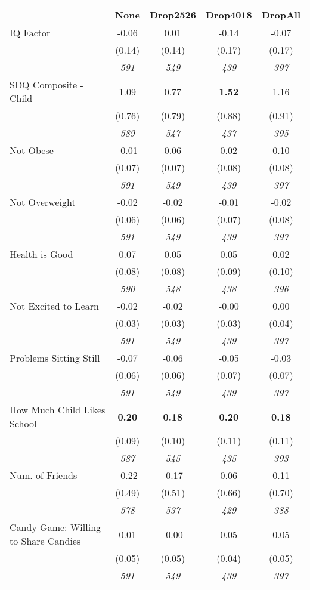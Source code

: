 \begin{tabular}{l c c c c}
\toprule
 & None & Drop2526 & Drop4018 & DropAll \\
\midrule
IQ Factor & -0.06 & 0.01 & -0.14 & -0.07 \\
& (0.14) & (0.14) & (0.17) & (0.17) \\
& \textit{ 591 } & \textit{ 549 } & \textit{ 439 } & \textit{ 397 } \\
SDQ Composite - Child & 1.09 & 0.77 & \textbf{ 1.52 } & 1.16 \\
& (0.76) & (0.79) & (0.88) & (0.91) \\
& \textit{ 589 } & \textit{ 547 } & \textit{ 437 } & \textit{ 395 } \\
Not Obese & -0.01 & 0.06 & 0.02 & 0.10 \\
& (0.07) & (0.07) & (0.08) & (0.08) \\
& \textit{ 591 } & \textit{ 549 } & \textit{ 439 } & \textit{ 397 } \\
Not Overweight & -0.02 & -0.02 & -0.01 & -0.02 \\
& (0.06) & (0.06) & (0.07) & (0.08) \\
& \textit{ 591 } & \textit{ 549 } & \textit{ 439 } & \textit{ 397 } \\
Health is Good & 0.07 & 0.05 & 0.05 & 0.02 \\
& (0.08) & (0.08) & (0.09) & (0.10) \\
& \textit{ 590 } & \textit{ 548 } & \textit{ 438 } & \textit{ 396 } \\
Not Excited to Learn & -0.02 & -0.02 & -0.00 & 0.00 \\
& (0.03) & (0.03) & (0.03) & (0.04) \\
& \textit{ 591 } & \textit{ 549 } & \textit{ 439 } & \textit{ 397 } \\
Problems Sitting Still & -0.07 & -0.06 & -0.05 & -0.03 \\
& (0.06) & (0.06) & (0.07) & (0.07) \\
& \textit{ 591 } & \textit{ 549 } & \textit{ 439 } & \textit{ 397 } \\
How Much Child Likes School & \textbf{ 0.20 } & \textbf{ 0.18 } & \textbf{ 0.20 } & \textbf{ 0.18 } \\
& (0.09) & (0.10) & (0.11) & (0.11) \\
& \textit{ 587 } & \textit{ 545 } & \textit{ 435 } & \textit{ 393 } \\
Num. of Friends & -0.22 & -0.17 & 0.06 & 0.11 \\
& (0.49) & (0.51) & (0.66) & (0.70) \\
& \textit{ 578 } & \textit{ 537 } & \textit{ 429 } & \textit{ 388 } \\
Candy Game: Willing to Share Candies & 0.01 & -0.00 & 0.05 & 0.05 \\
& (0.05) & (0.05) & (0.04) & (0.05) \\
& \textit{ 591 } & \textit{ 549 } & \textit{ 439 } & \textit{ 397 } \\
\bottomrule
\end{tabular}
